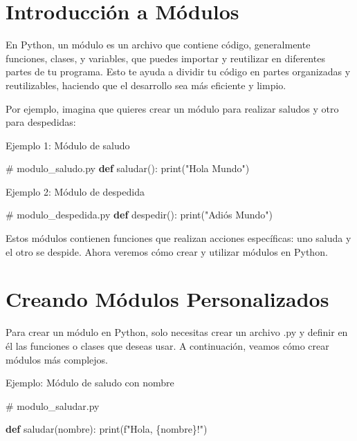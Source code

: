 \documentclass[
  a4paper,
  DIV=11,
  numbers=noendperiod,
  onepage,
  openany]{scrreprt}
\newenvironment{Shaded}{\begin{snugshade}}{\end{snugshade}}
\newcommand{\BuiltInTok}[1]{\textcolor[rgb]{0.00,0.23,0.31}{#1}}
\newcommand{\CommentTok}[1]{\textcolor[rgb]{0.37,0.37,0.37}{#1}}
\newcommand{\KeywordTok}[1]{\textcolor[rgb]{0.00,0.23,0.31}{\textbf{#1}}}
\newcommand{\NormalTok}[1]{\textcolor[rgb]{0.00,0.23,0.31}{#1}}
\newcommand{\SpecialCharTok}[1]{\textcolor[rgb]{0.37,0.37,0.37}{#1}}
\newcommand{\SpecialStringTok}[1]{\textcolor[rgb]{0.13,0.47,0.30}{#1}}
\newcommand{\StringTok}[1]{\textcolor[rgb]{0.13,0.47,0.30}{#1}}
\begin{document}
\section{Introducción a Módulos}\label{introducciuxf3n-a-muxf3dulos}

En Python, un módulo es un archivo que contiene código, generalmente
funciones, clases, y variables, que puedes importar y reutilizar en
diferentes partes de tu programa. Esto te ayuda a dividir tu código en
partes organizadas y reutilizables, haciendo que el desarrollo sea más
eficiente y limpio.

Por ejemplo, imagina que quieres crear un módulo para realizar saludos y
otro para despedidas:

Ejemplo 1: Módulo de saludo

\begin{Shaded}
\begin{Highlighting}[]
\CommentTok{\# modulo\_saludo.py}
\KeywordTok{def}\NormalTok{ saludar():}
    \BuiltInTok{print}\NormalTok{(}\StringTok{"Hola Mundo"}\NormalTok{)}
\end{Highlighting}
\end{Shaded}

Ejemplo 2: Módulo de despedida

\begin{Shaded}
\begin{Highlighting}[]
\CommentTok{\# modulo\_despedida.py}
\KeywordTok{def}\NormalTok{ despedir():}
    \BuiltInTok{print}\NormalTok{(}\StringTok{"Adiós Mundo"}\NormalTok{)}
\end{Highlighting}
\end{Shaded}

Estos módulos contienen funciones que realizan acciones específicas: uno
saluda y el otro se despide. Ahora veremos cómo crear y utilizar módulos
en Python.

\section{Creando Módulos
Personalizados}\label{creando-muxf3dulos-personalizados}

Para crear un módulo en Python, solo necesitas crear un archivo .py y
definir en él las funciones o clases que deseas usar. A continuación,
veamos cómo crear módulos más complejos.

Ejemplo: Módulo de saludo con nombre

\begin{Shaded}
\begin{Highlighting}[]
\CommentTok{\# modulo\_saludar.py}

\KeywordTok{def}\NormalTok{ saludar(nombre):}
    \BuiltInTok{print}\NormalTok{(}\SpecialStringTok{f"Hola, }\SpecialCharTok{\{}\NormalTok{nombre}\SpecialCharTok{\}}\SpecialStringTok{!"}\NormalTok{)}
\end{Highlighting}
\end{Shaded}
\end{document}
